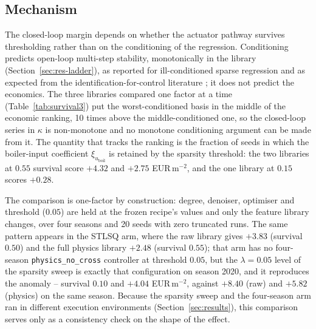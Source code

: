 \subsection{Mechanism}
\label{sec:res-mech}

The closed-loop margin depends on whether the actuator pathway survives thresholding
rather than on the conditioning of the regression. Conditioning predicts open-loop
multi-step stability, monotonically in the library (Section~\ref{sec:res-ladder}), as
reported for ill-conditioned sparse regression \cite{cortiella2021} and as expected from
the identification-for-control literature \cite{gevers1993,vandenhof1995}; it does not
predict the economics. The three libraries
compared one factor at a time (Table~\ref{tab:survival3}) put the worst-conditioned basis
in the middle of the economic ranking, 10 times above the middle-conditioned one,
so the closed-loop series in $\kappa$ is non-monotone and no monotone conditioning
argument can be made from it. The quantity that tracks the ranking is the fraction of
seeds in which the boiler-input coefficient $\xi_{u_{\mathrm{boil}}}$ is retained by the
sparsity threshold: the two libraries at $0.55$ survival score $+4.32$ and $+2.75$
EUR\,m$^{-2}$, and the one library at $0.15$ scores $+0.28$.

The comparison is one-factor by construction: degree, denoiser, optimiser and threshold
($0.05$) are held at the frozen recipe's values and only the feature library changes, over
four seasons and 20 seeds with zero truncated runs. The same pattern appears in the STLSQ
arm, where the raw library gives $+3.83$ (survival $0.50$) and the full physics library
$+2.48$ (survival $0.55$); that arm has no four-season \texttt{physics\_no\_cross}
controller at threshold $0.05$, but the $\lambda = 0.05$ level of the sparsity sweep is
exactly that configuration on season 2020, and it reproduces the anomaly -- survival
$0.10$ and $+4.04$ EUR\,m$^{-2}$, against $+8.40$ (raw) and $+5.82$ (physics) on the same
season. Because the sparsity sweep and the four-season arm ran in different execution
environments (Section~\ref{sec:results}), this comparison serves only as a consistency
check on the shape of the effect.

